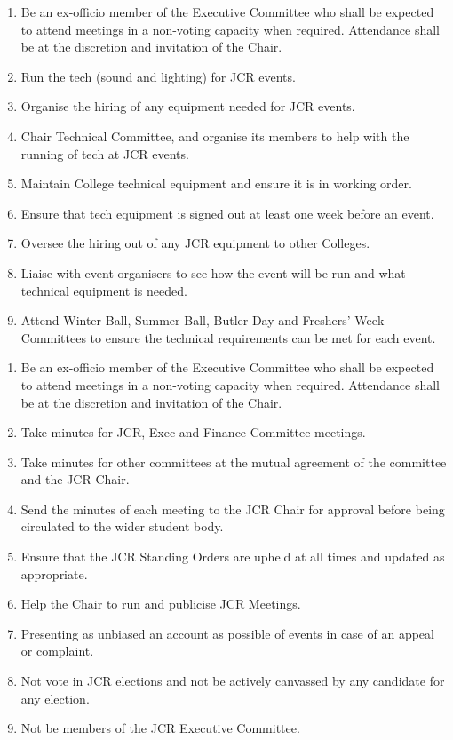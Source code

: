 \begin{enumerate}
    \item Be an ex-officio member of the Executive Committee who shall be expected to attend meetings in a non-voting capacity when required. Attendance shall be at the discretion and invitation of the Chair.
    \item Run the tech (sound and lighting) for JCR events.
    \item Organise the hiring of any equipment needed for JCR events.
    \item Chair Technical Committee, and organise its members to help with the running of tech at JCR events.
    \item Maintain College technical equipment and ensure it is in working order.
    \item Ensure that tech equipment is signed out at least one week before an event.
    \item Oversee the hiring out of any JCR equipment to other Colleges. 
    \item Liaise with event organisers to see how the event will be run and what technical equipment is needed. 
    \item Attend Winter Ball, Summer Ball, Butler Day and Freshers' Week Committees to ensure the technical requirements can be met for each event.
\end{enumerate}

\begin{enumerate}
    \item Be an ex-officio member of the Executive Committee who shall be expected to attend meetings in a non-voting capacity when required. Attendance shall be at the discretion and invitation of the Chair.
    \item Take minutes for JCR, Exec and Finance Committee meetings.
    \item Take minutes for other committees at the mutual agreement of the committee and the JCR Chair.
    \item Send the minutes of each meeting to the JCR Chair for approval before being circulated to the wider student body. 
    \item Ensure that the JCR Standing Orders are upheld at all times and updated as appropriate. 
    \item Help the Chair to run and publicise JCR Meetings.
    \item Presenting as unbiased an account as possible of events in case of an appeal or complaint.
    \item Not vote in JCR elections and not be actively canvassed by any candidate for any election. 
    \item Not be members of the JCR Executive Committee.
\end{enumerate}

